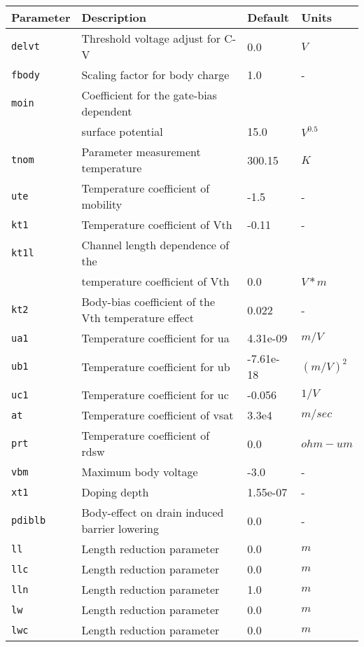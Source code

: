 \documentclass{article}
\begin{document}
\newpage
\begin{table}[H]
\begin{tabular}{|l| l| l| l|}
\hline
\textbf{Parameter} & \textbf{Description} & \textbf{Default} & \textbf{Units} \\
\hline
\texttt{delvt} & Threshold voltage adjust for C-V & 0.0 & $V$\\
\texttt{fbody} & Scaling factor for body charge & 1.0 & -\\
\texttt{moin} & Coefficient for the gate-bias dependent & & \\
              & surface potential & 15.0 & $V^{0.5}$\\
\texttt{tnom} & Parameter measurement temperature & 300.15 & $K$\\
\texttt{ute} & Temperature coefficient of mobility & -1.5 & -\\
\texttt{kt1} & Temperature coefficient of Vth & -0.11 & -\\
\texttt{kt1l} & Channel length dependence of the & & \\
             & temperature coefficient of Vth & 0.0 & $V*m$\\
\texttt{kt2} & Body-bias coefficient of the Vth temperature effect & 0.022 & -\\
\texttt{ua1} & Temperature coefficient for ua & 4.31e-09 & $m/V$\\
\texttt{ub1} & Temperature coefficient for ub& -7.61e-18 & $(m/V)^2$\\
\texttt{uc1} & Temperature coefficient for uc & -0.056 & $1/V$\\
\texttt{at} & Temperature coefficient of vsat & 3.3e4 & $m/sec$\\
\texttt{prt} & Temperature coefficient of rdsw & 0.0 & $ohm-um$\\
\texttt{vbm} & Maximum body voltage & -3.0 & -\\
\texttt{xt1} & Doping depth & 1.55e-07 & -\\
\texttt{pdiblb} & Body-effect on drain induced barrier lowering & 0.0 & -\\
\texttt{ll} &  Length reduction parameter & 0.0 & $m$\\
\texttt{llc} &  Length reduction parameter & 0.0 & $m$\\
\texttt{lln} & Length reduction parameter & 1.0 & $m$\\
\texttt{lw} & Length reduction parameter & 0.0 & $m$\\
\texttt{lwc} & Length reduction parameter & 0.0 & $m$\\

\end{tabular}
\end{table}
\end{document}
